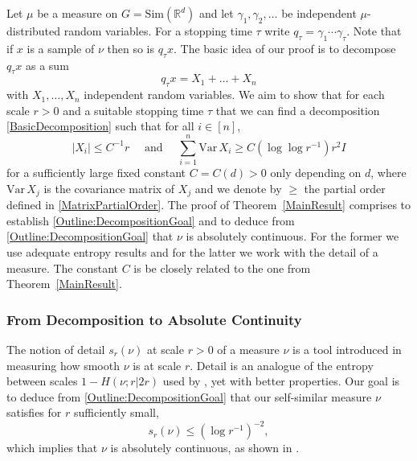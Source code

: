 \documentclass[10pt, english,oneside,reqno]{amsart}
\theoremstyle{plain}
\theoremstyle{remark}
\numberwithin{equation}{section}
\numberwithin{figure}{section}
\newcommand{\R}{\mathbb{R}}
\newcommand{\Var}{\mathrm{Var}}
\begin{document}
Let $\mu$ be a measure on $G = \mathrm{Sim}(\R^d)$ and let $\gamma_1, \gamma_2, \ldots$ be independent $\mu$-distributed random variables. For a stopping time $\tau$ write $q_{\tau} = \gamma_1 \cdots \gamma_{\tau}$. Note that if $x$ is a sample of $\nu$ then so is $q_{\tau} x$. The basic idea of our proof is to decompose $q_{\tau} x$ as a sum 
\begin{equation}\label{BasicDecomposition}
    q_{\tau} x = X_1 + \dots + X_{n}
\end{equation}
with $X_1, \ldots , X_n$ independent random variables. We aim to show that for each scale $r > 0$ and a suitable stopping time $\tau$ that we can find a decomposition \eqref{BasicDecomposition} such that for all $i \in [n]$, 
\begin{equation}\label{Outline:DecompositionGoal}
    |X_i| \leq C^{-1}r \quad \text{ and } \quad  \sum_{i = 1}^n \mathrm{Var} \, X_i \geq C(\log \log r^{-1}) r^2I 
\end{equation} for a sufficiently large fixed constant $C = C(d) > 0$ only depending on $d$, where $\Var \, X_j$ is the covariance matrix of $X_j$ and we denote by $\geq$ the partial order defined in \eqref{MatrixPartialOrder}. The proof of Theorem~\ref{MainResult} comprises to establish \eqref{Outline:DecompositionGoal} and to deduce from \eqref{Outline:DecompositionGoal} that $\nu$ is absolutely continuous. For the former we use adequate entropy results and for the latter we work with the detail of a measure. The constant $C$ is be closely related to the one from Theorem~\ref{MainResult}.

\subsubsection*{\normalfont\textbf{From Decomposition to Absolute Continuity}} The notion of detail $s_{r}(\nu)$ at scale $r > 0$ of a measure $\nu$ is a tool introduced in \cite{Kittle2021} measuring how smooth $\nu$ is at scale $r$. Detail is an analogue of the entropy between scales $1 - H(\nu; r|2r)$ used by \cite{Varju2019}, yet with better properties. Our goal is to deduce from \eqref{Outline:DecompositionGoal} that our self-similar measure $\nu$ satisfies for $r$ sufficiently small,  
\begin{equation}\label{Outline:DetailDecay}
    s_{r}(\nu) \leq (\log r^{-1})^{-2},
\end{equation}
which implies that $\nu$ is absolutely continuous, as shown in \cite{Kittle2021}.  
\end{document}
